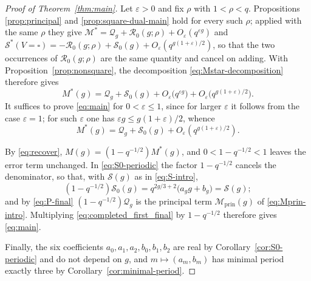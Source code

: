 \documentclass[a4paper,reqno]{amsart}
\numberwithin{equation}{section}
\theoremstyle{remark}
\theoremstyle{definition}
\begin{document}
\begin{proof}[Proof of Theorem~\ref{thm:main}]
Let $\varepsilon>0$ and fix $\rho$ with $1<\rho<q$. Propositions
\ref{prop:principal} and \ref{prop:square-dual-main} hold for every such
$\rho$; applied with the same $\rho$ they give
$\mathcal M^*=\mathcal Q_g+\mathcal R_0(g;\rho)
+O_\varepsilon(q^{\varepsilon g})$ and
$\mathcal S^*(V=\square)=-\mathcal R_0(g;\rho)+\mathcal S_0(g)
+O_\varepsilon(q^{g(1+\varepsilon)/2})$, so that the two occurrences of
$\mathcal R_0(g;\rho)$ are the same quantity and cancel on adding. With
Proposition~\ref{prop:nonsquare}, the decomposition
\eqref{eq:Mstar-decomposition} therefore gives
$$
M^*(g)=\mathcal Q_g+\mathcal S_0(g)
+O_\varepsilon\bigl(q^{\varepsilon g}\bigr)
+O_\varepsilon\bigl(q^{g(1+\varepsilon)/2}\bigr).
$$
It suffices to prove \eqref{eq:main} for $0<\varepsilon\le1$, since for
larger $\varepsilon$ it follows from the case $\varepsilon=1$; for such
$\varepsilon$ one has $\varepsilon g\le g(1+\varepsilon)/2$, whence
\begin{equation}\label{eq:completed_first_final}
M^*(g)=\mathcal Q_g+\mathcal S_0(g)
+O_\varepsilon\!\left(q^{g(1+\varepsilon)/2}\right).
\end{equation}

By \eqref{eq:recover}, $M(g)=(1-q^{-1/2})M^*(g)$, and $0<1-q^{-1/2}<1$
leaves the error term unchanged. In \eqref{eq:S0-periodic} the factor
$1-q^{-1/2}$ cancels the denominator, so that, with $\mathcal S(g)$ as in
\eqref{eq:S-intro},
$$
(1-q^{-1/2})\mathcal S_0(g)
=q^{2g/3+2}\bigl(a_gg+b_g\bigr)=\mathcal S(g);
$$
and by \eqref{eq:P-final} $(1-q^{-1/2})\mathcal Q_g$ is the principal term
$\mathcal M_{\mathrm{prin}}(g)$ of \eqref{eq:Mprin-intro}. Multiplying
\eqref{eq:completed_first_final} by $1-q^{-1/2}$ therefore gives
\eqref{eq:main}.

Finally, the six coefficients $a_0,a_1,a_2,b_0,b_1,b_2$ are real by
Corollary~\ref{cor:S0-periodic} and do not depend on $g$, and
$m\mapsto(a_m,b_m)$ has minimal period exactly three by
Corollary~\ref{cor:minimal-period}.
\end{proof}
\end{document}
